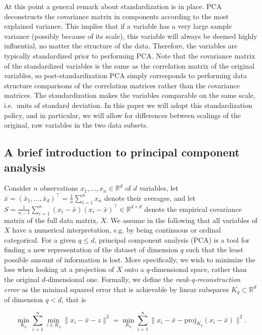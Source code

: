\documentclass[a4paper,14pt]{article}
\newcommand{\RR}{\mathbb{R}}
\begin{document}
At this point a general remark about standardization is in place. PCA deconstructs the covariance matrix in components according to the most explained variance. This implies that if a variable has a very large sample variance (possibly because of its scale), this variable will always be deemed highly influential, no matter the structure of the data. Therefore, the variables are typically standardized prior to performing PCA. Note that the covariance matrix of the standardized variables is the same as the correlation matrix of the original variables, so post-standardization PCA simply corresponds to performing data structure comparisons of the correlation matrices rather than the covariance matrices. The standardization makes the variables comparable on the same scale, i.e.\ units of standard deviation. In this paper we will adopt this standardization policy, and in particular, we will allow for differences between scalings of the original, raw variables in the two data subsets.

\subsection*{A brief introduction to principal component analysis}
\label{sec:introPCA}
Consider $n$ observations $x_1,\dotsc,x_n \in \RR^d$ of $d$ variables, let $\bar{x} = {(\bar{x}_1, ..., \bar{x}_d)}^\top = \frac{1}{n} \sum_{i=1}^n x_n$ denote their averages, and let $S = \frac{1}{n-1} \sum_{i=1}^n (x_i-\bar{x}) {(x_i-\bar{x})}^\top \in \RR^{d \times d}$ denote the empirical covariance matrix of the full data matrix, $X$. We assume in the following that all variables of $X$ have a numerical interpretation, e.g. by being continuous or ordinal categorical. For a given $q \leq d$, principal component analysis (PCA) is a tool for finding a new representation of the dataset of dimension $q$ such that the least possible amount of information is lost. More specifically, we wish to minimize the loss when looking at a projection of $X$ onto a $q$-dimensional space, rather than the original $d$-dimensional one. Formally, we define the \emph{rank-q-reconstruction error} as the minimal squared error that is achievable by linear subspaces $K_q \subset \RR^d$ of dimension $q < d$, that is

\begin{equation}
\min_{K_q} \sum_{i=1}^n \min_{z \in K_q} \lVert x_i - \bar{x} - z \rVert^2 =
\min_{K_q} \sum_{i=1}^n \lVert x_i - \bar{x} - \text{proj}_{K_q}(x_i - \bar{x}) \rVert^2.
\end{equation}
\end{document}
